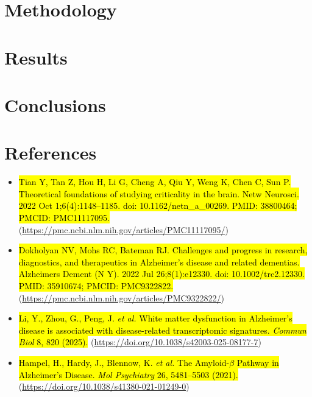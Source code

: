 \documentclass[12pt,a4paper]{article}
\begin{document}
\section{Methodology}


\section{Results}


\section{Conclusions}


\section*{References}

\begin{itemize}[leftmargin=*]
  \item \hl{Tian Y, Tan Z, Hou H, Li G, Cheng A, Qiu Y, Weng K, Chen C, Sun P. Theoretical foundations of studying criticality in the brain. Netw Neurosci. 2022 Oct 1;6(4):1148--1185. doi: 10.1162/netn\_a\_00269. PMID: 38800464; PMCID: PMC11117095.} (\url{https://pmc.ncbi.nlm.nih.gov/articles/PMC11117095/})

  \item \hl{Dokholyan NV, Mohs RC, Bateman RJ. Challenges and progress in research, diagnostics, and therapeutics in Alzheimer's disease and related dementias. Alzheimers Dement (N Y). 2022 Jul 26;8(1):e12330. doi: 10.1002/trc2.12330. PMID: 35910674; PMCID: PMC9322822.} (\url{https://pmc.ncbi.nlm.nih.gov/articles/PMC9322822/})

  \item \hl{Li, Y., Zhou, G., Peng, J. \emph{et al.} White matter dysfunction in Alzheimer's disease is associated with disease-related transcriptomic signatures. \emph{Commun Biol} 8, 820 (2025).} (\url{https://doi.org/10.1038/s42003-025-08177-7})

  \item \hl{Hampel, H., Hardy, J., Blennow, K. \emph{et al.} The Amyloid-$\beta$ Pathway in Alzheimer's Disease. \emph{Mol Psychiatry} 26, 5481--5503 (2021).} (\url{https://doi.org/10.1038/s41380-021-01249-0})
\end{itemize}

% 
% 
\end{document}
